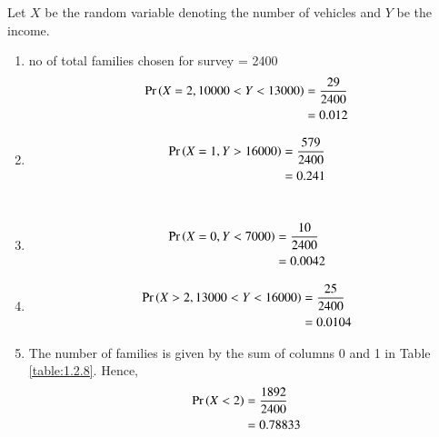 Let $X$ be the random variable denoting the number of vehicles and $Y$ be the income.
\begin{enumerate}
\item no of total families chosen for survey = 2400
\begin{align}
\Pr\left(X = 2, 10000 < Y < 13000\right)  &= \frac{29}{2400}
\\
&= 0.012
\end{align}
\item 
\begin{align}
\Pr\left(X = 1,  Y > 16000\right)  &= \frac{579}{2400}
\\
&= 0.241
\end{align}
\\
\item 
\begin{align}
\Pr\left(X = 0,  Y < 7000\right)   &= \frac{10}{2400}
\\
&= 0.0042
\end{align}
\item 
\begin{align}
\Pr\left(X > 2,  13000 < Y < 16000\right) &= \frac{25}{2400}
\\
&= 0.0104
\end{align}
\item The number of families is given by the sum of columns 0 and 1 in Table \ref{table:1.2.8}.  Hence, 
\begin{align}
\Pr\left(X <  2\right)
 &= \frac{1892}{2400}
\\
&= 0.78833
\end{align}
\end{enumerate}
